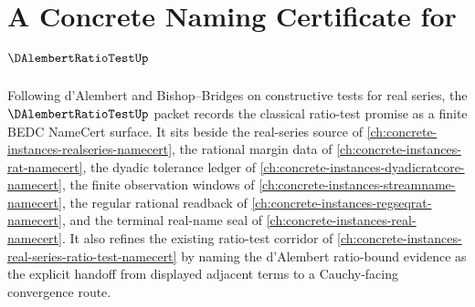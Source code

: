 \chapter{A Concrete Naming Certificate for $\DAlembertRatioTestUp$}
\label{ch:concrete-instances-dalembert-ratio-test-namecert}

Following d'Alembert and Bishop--Bridges on constructive tests for real series, the $\DAlembertRatioTestUp$ packet records the classical ratio-test promise as a finite BEDC NameCert surface. It sits beside the real-series source of \autoref{ch:concrete-instances-realseries-namecert}, the rational margin data of \autoref{ch:concrete-instances-rat-namecert}, the dyadic tolerance ledger of \autoref{ch:concrete-instances-dyadicratcore-namecert}, the finite observation windows of \autoref{ch:concrete-instances-streamname-namecert}, the regular rational readback of \autoref{ch:concrete-instances-regseqrat-namecert}, and the terminal real-name seal of \autoref{ch:concrete-instances-real-namecert}. It also refines the existing ratio-test corridor of \autoref{ch:concrete-instances-real-series-ratio-test-namecert} by naming the d'Alembert ratio-bound evidence as the explicit handoff from displayed adjacent terms to a Cauchy-facing convergence route.


